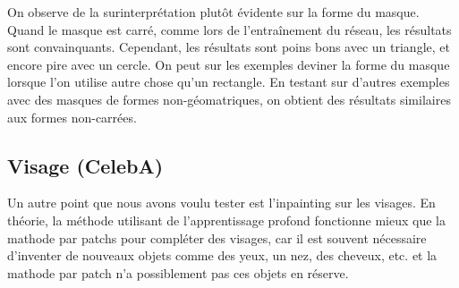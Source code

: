 \documentclass[12pt]{article}
\begin{document}
\begin{figure}[htb]
  \hfill
  \hfill
  \caption{}\label{fig:occlus_dynamic}
\end{figure}

On observe de la surinterprétation plutôt évidente sur la forme du masque. Quand le masque est carré, comme lors de l'entraînement du réseau, les résultats sont convainquants. Cependant, les résultats sont poins bons avec un triangle, et encore pire avec un cercle. On peut sur les exemples deviner la forme du masque lorsque l'on utilise autre chose qu'un rectangle. En testant sur d'autres exemples avec des masques de formes non-géomatriques, on obtient des résultats similaires aux formes non-carrées.

\subsection{Visage (CelebA)}

Un autre point que nous avons voulu tester est l'inpainting sur les visages. En théorie, la méthode utilisant de l'apprentissage profond fonctionne mieux que la mathode par patchs pour compléter des visages, car il est souvent nécessaire d'inventer de nouveaux objets comme des yeux, un nez, des cheveux, etc. et la mathode par patch n'a possiblement pas ces objets en réserve.
\end{document}
